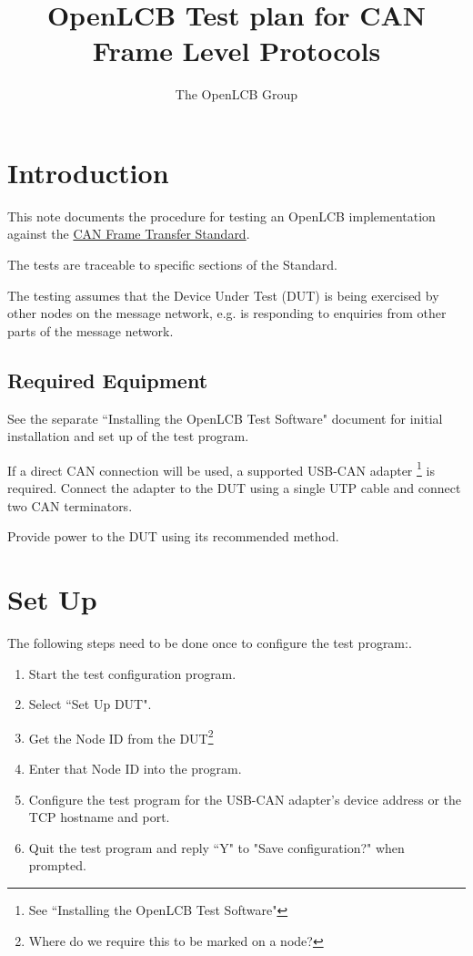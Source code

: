 \documentclass[11pt]{article}
\title{OpenLCB Test plan for CAN Frame Level Protocols}
\author{The OpenLCB Group}
\begin{document}
\maketitle


\section{Introduction}

This note documents the procedure for testing an OpenLCB implementation
against the
\href{https://nbviewer.org/github/openlcb/documents/blob/master/standards/CanFrameTransferS.pdf}{CAN Frame Transfer Standard}.

The tests are traceable to specific sections of the Standard.

The testing assumes that the Device Under Test (DUT) is being exercised by other
nodes on the message network, 
e.g. is responding to enquiries from other parts of the message network.

\subsection{Required Equipment}

See the separate ``Installing the OpenLCB Test Software" document for initial installation 
and set up of the test program.

If a direct CAN connection will be used,
a supported USB-CAN adapter
    \footnote{See ``Installing the OpenLCB Test Software"}
is required. 
Connect the adapter to the DUT using a single UTP cable and connect two CAN terminators.

Provide power to the DUT using its recommended method.

\section{Set Up}
The following steps need to be done once to configure the test program:.
\begin{enumerate}
\item Start the test configuration program. 
\item Select ``Set Up DUT".
\item Get the Node ID from the DUT\footnote{Where do we require this to be marked on a node?} 
\item Enter that Node ID into the program.
\item Configure the test program for the USB-CAN adapter's device address
        or the TCP hostname and port.
\item Quit the test program and reply ``Y" to "Save configuration?" when prompted.
\end{enumerate}
\end{document}

